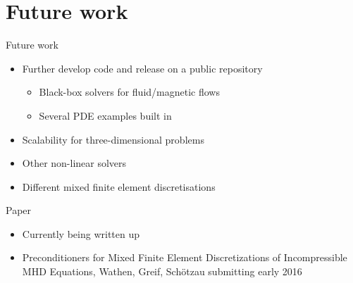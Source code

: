 \documentclass[12pt]{beamer}
\begin{document}
\section{Future work}
\begin{frame}{Future work}

\begin{itemize}
\item Further develop code and release on a public repository
  \begin{itemize}
    \item Black-box solvers for fluid/magnetic flows
    \item Several PDE examples built in
  \end{itemize}
\item Scalability for three-dimensional problems
\item Other non-linear solvers
\item Different mixed finite element discretisations
\end{itemize}
\end{frame}
\begin{frame}{Paper}
    \begin{itemize}
        \item Currently being written up
        \item Preconditioners for Mixed Finite Element Discretizations of Incompressible MHD Equations, Wathen, Greif, Sch\"{o}tzau submitting early 2016
    \end{itemize}
\end{frame}
\end{document}
